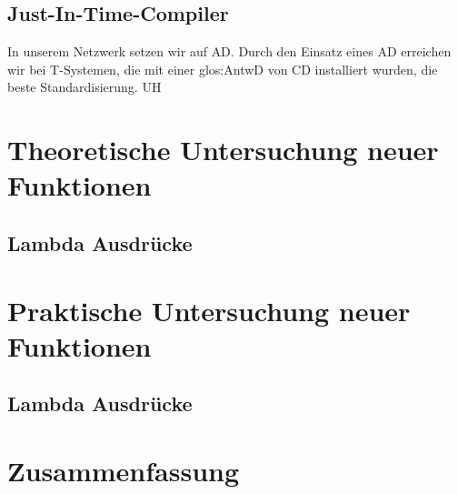 \section{Just-In-Time-Compiler}
\label{sec:JIT}

In unserem Netzwerk setzen wir auf \gls{AD}. Durch den Einsatz
eines \gls{AD} erreichen wir bei \gls{T}-Systemen, die mit einer
\gls{glos:AntwD} von \gls{CD} installiert wurden, die beste Standardisierung.
\gls{UH}

\chapter{Theoretische Untersuchung neuer Funktionen}
\label{sec:Theorie}

\section{Lambda Ausdrücke}
\label{sec:Lambda}

\chapter{Praktische Untersuchung neuer Funktionen}
\label{sec:Praxis}

\section{Lambda Ausdrücke}
\label{sec:Lambda}

\chapter{Zusammenfassung}
\label{sec:Fazit}
